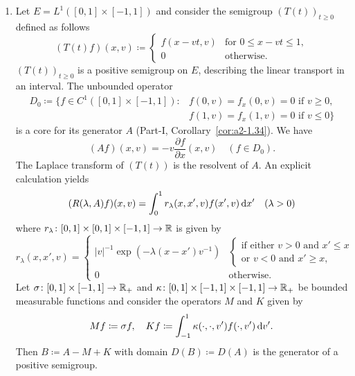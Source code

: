 \begin{examples}
\begin{enumerate}[\upshape (i), wide, labelindent=.25em]
	\item 
	Let $E = L^{1}([0,1] \times[-1,1] )$ and consider the semigroup $(T(t))_{t\geq 0}$ defined as follows
	\begin{equation}\label{eq:c3-3.3}
		(T(t)f)(x,v) \coloneq \begin{cases}
			f(x-vt,v) & \text{for } 0 \leq x-vt \leq 1  , \\
			0 & \text{otherwise}.
		\end{cases}
	\end{equation}
		$(T(t))_{t\geq 0}$ is a positive semigroup on $E$, describing the linear transport%
        in an interval. The unbounded operator 
	\begin{align*}
		D_{0} \coloneq \{f \in C^{1}([0,1]\times[-1,1]) \colon  
		& f(0,v) = f_{x}(0,v) = 0 \text{ if } v \geq 0 , \\ 
		& f(1,v) = f_{x}(1,v) = 0 \text{ if } v \leq 0\}
	\end{align*}
	is a core%
    for its generator $A$ (\cf Part-I, Corollary~\ref{cor:a2-1.34}).
	We have
	\begin{equation}\label{eq:c3-3.4}
		(Af)(x,v) = -v\frac{\partial f}{\partial x}(x,v) \quad (f \in D_{0}).
	\end{equation}
	The Laplace transform of\/ $(T(t))$ is the resolvent of\/ $A$.
	An explicit calculation yields
	\begin{equation}\label{eq:c3-3.5}
		(R(\lambda,A)f)(x,v) = \int_{0}^{1} r_{\lambda}(x,x',v)f(x',v)\mathop{}\!\mathrm{d}{x}' \quad (\lambda > 0)
	\end{equation}
	where $r_{\lambda} \colon [0,1] \times [0,1] \times [-1,1] \to \mathbb{R} $ is given by
	\begin{equation*}
		r_{\lambda}(x,x',v) = \begin{cases}
			|v|^{-1}\exp(-\lambda(x-x')v^{-1}) & 
			\begin{cases}\text{if either } v>0 \text{ and } x'\leq x \\
		    \text{or } v<0 \text{ and } x'\geq x, 
		    \end{cases}\\
			0 & \text{otherwise}.
		\end{cases}
	\end{equation*}
	Let $\sigma \colon [0,1]\times[-1,1] \to \mathbb{R} _{+}$ and $\kappa \colon [0,1]\times[-1,1]\times[-1,1] \to \mathbb{R} _{+}$ be bounded measurable functions and consider the operators $M$ and $K$ given by
	\begin{equation}\label{eq:c3-3.6}
		Mf \coloneq \sigma f, \quad Kf \coloneq \int_{-1}^{1} \kappa(\cdot,\cdot,v')f(\cdot,v') \mathop{}\!\mathrm{d}{v'}.
	\end{equation}
	Then $B \coloneq A - M + K$ with domain $D(B) \coloneq D(A)$ is the generator of a positive semigroup.
	

\end{enumerate}
\end{examples}
